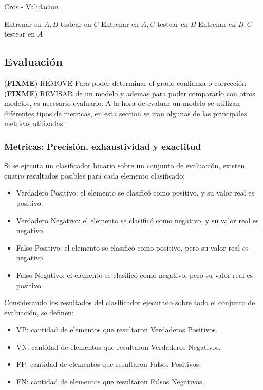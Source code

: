 \documentclass[a4paper,11pt,spanish]{book}
\newcommand*{\FIXME}[1]{{(\textbf{FIXME}) {#1}}}
\begin{document}
	  \begin{algorithm}[h]
	    \caption{Cros - Validacion}
	    \label{crossvalid}
	    \begin{algorithmic}
	      \State Entrenar en ${A,B}$ testear en ${C}$
	      \State Entrenar en ${A,C}$ testear en ${B}$
	      \State Entrenar en ${B,C}$ testear en ${A}$
	    \end{algorithmic}
	  \end{algorithm}


      \subsection{Evaluación}\FIXME{REMOVE}
	Para poder determinar el grado confianza o corrección \FIXME{REVISAR} de un modelo y ademas para poder compararlo con otros modelos, es necesario evaluarlo.
	A la hora de evaluar un modelo se utilizan diferentes tipos de metricas, en esta seccion se iran algunas de las principales métricas utilizadas.

	\subsubsection {Metricas: Precisión, exhaustividad y exactitud}
	  Si se ejecuta un clasificador binario sobre un conjunto de evaluación, existen cuatro resultados posibles para cada elemento clasificado:
	  \begin{itemize}
	    \item Verdadero Positivo: el elemento se clasificó como positivo, y su valor real es positivo.
	    \item Verdadero Negativo: el elemento se clasificó como negativo, y su valor real es negativo.
	    \item Falso Positivo: el elemento se clasificó como positivo, pero su valor real es negativo.
	    \item Falso Negativo: el elemento se clasificó como negativo, pero su valor real es positivo.
	  \end{itemize}

	  Considerando los resultados del clasificador ejecutado sobre todo el conjunto de evaluación, se definen:
	  \begin{itemize}
	    \item VP: cantidad de elementos que resultaron Verdaderos Positivos.
	    \item VN: cantidad de elementos que resultaron Verdaderos Negativos.
	    \item FP: cantidad de elementos que resultaron Falsos Positivos.
	    \item FN: cantidad de elementos que resultaron Falsos Negativos.
	  \end{itemize}
\end{document}
